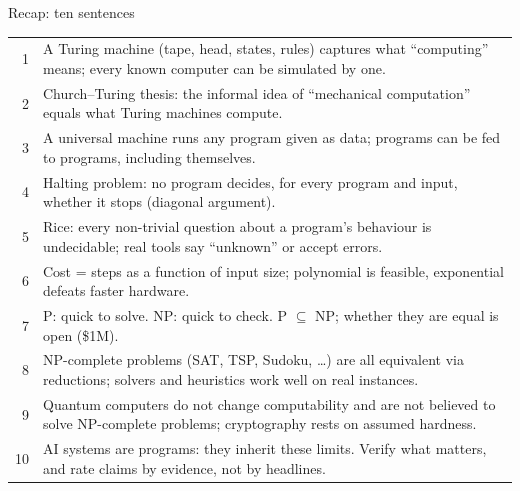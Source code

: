 \begin{frame}{Recap: ten sentences}
\begin{sfig}[0.8]
\begin{tabular}{@{}rL{128mm}@{}}
1 & A Turing machine (tape, head, states, rules) captures what ``computing'' means; every known computer can be simulated by one.\\
2 & Church--Turing thesis: the informal idea of ``mechanical computation'' equals what Turing machines compute.\\
3 & A universal machine runs any program given as data; programs can be fed to programs, including themselves.\\
4 & Halting problem: no program decides, for every program and input, whether it stops (diagonal argument).\\
5 & Rice: every non-trivial question about a program's behaviour is undecidable; real tools say ``unknown'' or accept errors.\\
6 & Cost = steps as a function of input size; polynomial is feasible, exponential defeats faster hardware.\\
7 & P: quick to solve. NP: quick to check. P $\subseteq$ NP; whether they are equal is open (\$1M).\\
8 & NP-complete problems (SAT, TSP, Sudoku, \ldots) are all equivalent via reductions; solvers and heuristics work well on real instances.\\
9 & Quantum computers do not change computability and are not believed to solve NP-complete problems; cryptography rests on assumed hardness.\\
10 & AI systems are programs: they inherit these limits. Verify what matters, and rate claims by evidence, not by headlines.\\
\end{tabular}
\end{sfig}
\end{frame}

